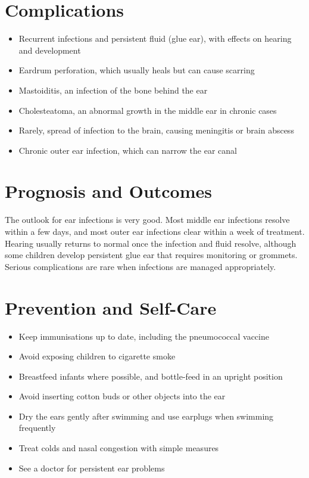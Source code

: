 \section*{Complications}
\begin{itemize}
    \item Recurrent infections and persistent fluid (glue ear), with effects on hearing and development
    \item Eardrum perforation, which usually heals but can cause scarring
    \item Mastoiditis, an infection of the bone behind the ear
    \item Cholesteatoma, an abnormal growth in the middle ear in chronic cases
    \item Rarely, spread of infection to the brain, causing meningitis or brain abscess
    \item Chronic outer ear infection, which can narrow the ear canal
\end{itemize}

\section*{Prognosis and Outcomes}
The outlook for ear infections is very good. Most middle ear infections resolve within a few days, and most outer ear infections clear within a week of treatment. Hearing usually returns to normal once the infection and fluid resolve, although some children develop persistent glue ear that requires monitoring or grommets. Serious complications are rare when infections are managed appropriately.

\section*{Prevention and Self-Care}
\begin{itemize}
    \item Keep immunisations up to date, including the pneumococcal vaccine
    \item Avoid exposing children to cigarette smoke
    \item Breastfeed infants where possible, and bottle-feed in an upright position
    \item Avoid inserting cotton buds or other objects into the ear
    \item Dry the ears gently after swimming and use earplugs when swimming frequently
    \item Treat colds and nasal congestion with simple measures
    \item See a doctor for persistent ear problems
\end{itemize}

